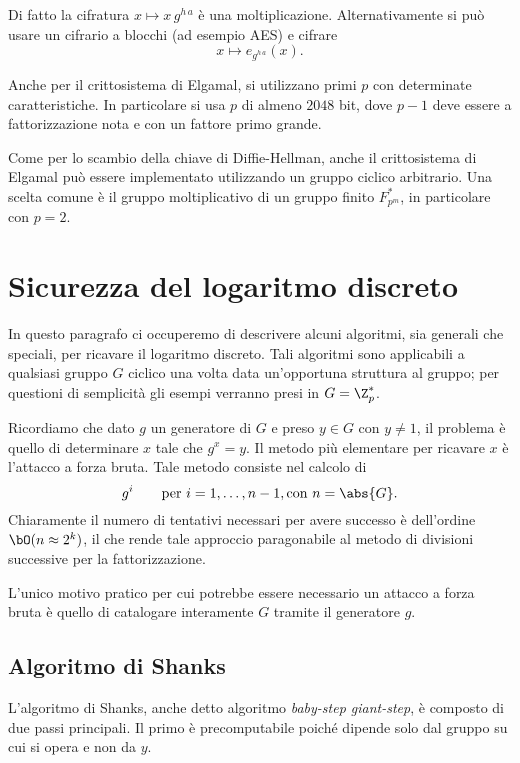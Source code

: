 	\begin{oss}
	Di fatto la cifratura \(x\mapsto x\,g^{h\,a}\) è una moltiplicazione. Alternativamente si può usare un cifrario a blocchi (ad esempio AES) e cifrare
		\[
		x \longmapsto e_{g^{h\,a}}(x).
		\]
	\end{oss}
	\noindent
	Anche per il crittosistema di Elgamal, si utilizzano primi \(p\) con determinate caratteristiche. In particolare si usa \(p\) di almeno \(2048\) bit, dove \(p-1\) deve essere a fattorizzazione nota e con un fattore primo grande.

	Come per lo scambio della chiave di Diffie-Hellman, anche il crittosistema di Elgamal può essere implementato utilizzando un gruppo ciclico arbitrario. Una scelta comune è il gruppo moltiplicativo di un gruppo finito \(F_{p^m}^*\), in particolare con \(p=2\).

\section{Sicurezza del logaritmo discreto}

	In questo paragrafo ci occuperemo di descrivere alcuni algoritmi, sia generali che speciali, per ricavare il logaritmo discreto. Tali algoritmi sono applicabili a qualsiasi gruppo \(G\) ciclico una volta data un'opportuna struttura al gruppo; per questioni di semplicità gli esempi verranno presi in \(G=\Z_p^*\).

	Ricordiamo che dato \(g\) un generatore di \(G\) e preso \(y\in G\) con \(y\neq 1\), il problema è quello di determinare \(x\) tale che \(g^x = y\).
	Il metodo più elementare per ricavare \(x\) è l'attacco a forza bruta. Tale metodo consiste nel calcolo di
		\[
		g^i \qquad\text{per } i = 1, \ldots ,n-1, \text{con } n=\abs{G}.
		\]
	Chiaramente il numero di tentativi necessari per avere successo è dell'ordine \(\bO(n\approx 2^k)\), il che rende tale approccio paragonabile al metodo di divisioni successive per la fattorizzazione.

	\begin{oss}
	L'unico motivo pratico per cui potrebbe essere necessario un attacco a forza bruta è quello di catalogare interamente \(G\) tramite il generatore \(g\).
	\end{oss}

\subsection{Algoritmo di Shanks}

	L'algoritmo di Shanks, anche detto algoritmo \emph{baby-step giant-step}, è composto di due passi principali. Il primo è precomputabile poiché dipende solo dal gruppo su cui si opera e non da \(y\). 

